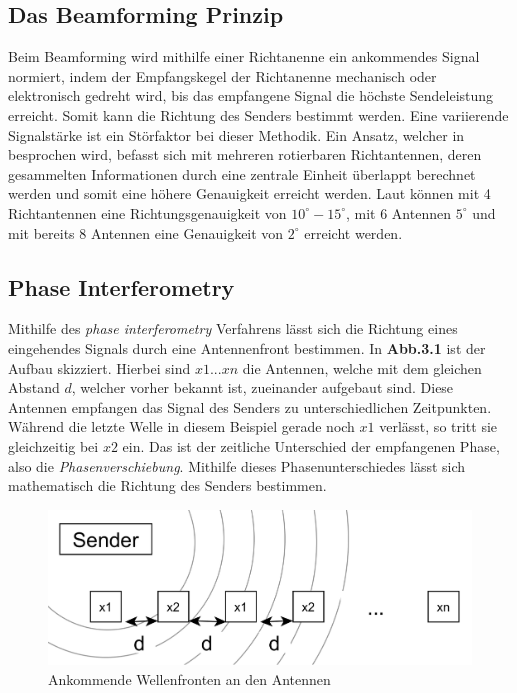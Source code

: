 \documentclass[12pt, a4wide]{scrreprt}
\begin{document}
    \subsection{Das Beamforming Prinzip}
Beim Beamforming wird mithilfe einer Richtanenne ein ankommendes Signal normiert, indem der Empfangskegel der Richtanenne mechanisch oder elektronisch gedreht wird, bis das empfangene Signal die höchste Sendeleistung erreicht. Somit kann die Richtung des Senders bestimmt werden. Eine variierende Signalstärke ist ein Störfaktor bei dieser Methodik. Ein Ansatz, welcher in \cite{q1} besprochen wird, befasst sich mit mehreren rotierbaren Richtantennen, deren gesammelten Informationen durch eine zentrale Einheit überlappt berechnet werden und somit eine höhere Genauigkeit erreicht werden. Laut \cite{q1} können mit 4 Richtantennen eine Richtungsgenauigkeit von $10^\circ -15^\circ$, mit 6 Antennen $5^\circ$ und mit bereits 8 Antennen eine Genauigkeit von $2^\circ$ erreicht werden.
    \subsection{Phase Interferometry}
Mithilfe des \textit{phase interferometry}\cite{q1} Verfahrens lässt sich die Richtung eines eingehendes Signals durch eine Antennenfront bestimmen. In {\bf Abb.3.1} ist der Aufbau skizziert. Hierbei sind $x1...xn$ die Antennen, welche mit dem gleichen Abstand $d$, welcher vorher bekannt ist, zueinander aufgebaut sind. Diese Antennen empfangen das Signal des Senders zu unterschiedlichen Zeitpunkten. Während die letzte Welle in diesem Beispiel gerade noch $x1$ verlässt, so tritt sie gleichzeitig bei $x2$ ein. Das ist der zeitliche Unterschied der empfangenen Phase, also die \textit{Phasenverschiebung}. Mithilfe dieses Phasenunterschiedes lässt sich mathematisch die Richtung des Senders bestimmen.\\

\begin{figure}[!htb]
\centering
\includegraphics[scale=.3]{phase_int2.png}
\caption{Ankommende Wellenfronten an den Antennen}
\end{figure}
\end{document}
